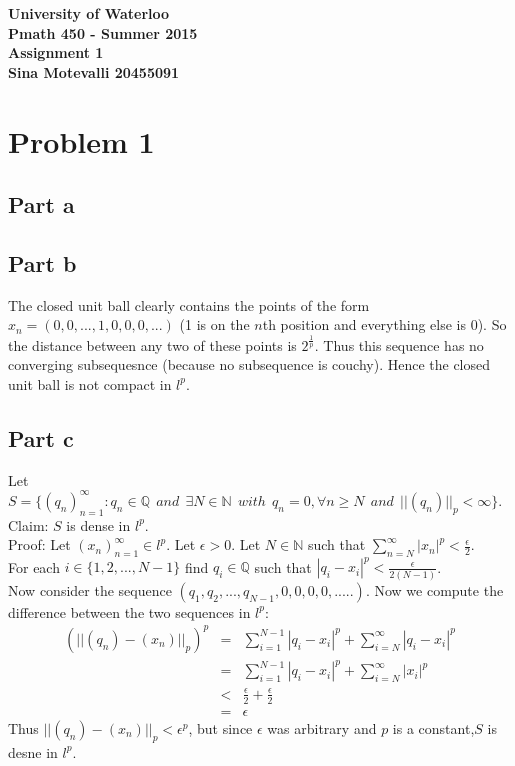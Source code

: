 \documentclass[12pt]{article}
\begin{document}
\begin{center}
  {\Large\bf University of Waterloo}\\
  \vspace{3mm}
         {\Large\bf Pmath 450 - Summer 2015}\\
         \vspace{2mm}
                {\Large\bf Assignment 1}\\
                \vspace{3mm}
                \textbf{Sina Motevalli 20455091}
\end{center}
\section*{Problem 1}
\subsection*{Part a}


\subsection*{Part b}
The closed unit ball clearly contains the points of the form
$x_n=(0,0,...,1,0,0,0,...)$ (1 is on the $n$th position and everything else is 0). 
So the distance between any two of these points is $2^{\frac{1}{p}}$. Thus this sequence has no converging subsequesnce (because no subsequence is couchy). Hence the closed unit ball is not compact in $l^p$.
\subsection*{Part c}
Let $S=\{(q_n)_{n=1}^{\infty} : q_n \in \mathbb{Q} \ \
and \ \ \exists N \in \mathbb{N} \ \ with \ \
q_n=0, \forall n \ge N \ \ and \ \
||(q_n)||_p < \infty\}$. \\
Claim: $S$ is dense in $l^p$.\\
Proof: Let $(x_n)_{n=1}^{\infty} \in l^p$. 
Let $\epsilon > 0$. Let $N \in \mathbb{N}$ such that
$\sum_{n=N}^{\infty} |x_n|^p < \frac{\epsilon}{2}$.
\\
For each $i \in \{1,2,...,N-1\}$ find $q_i \in \mathbb{Q}$ such that $|q_i-x_i|^p < \frac{\epsilon}{2(N-1)}$. \\
Now consider the sequence
$(q_1,q_2,...,q_{N-1},0,0,0,0,.....)$. Now we compute the difference between the two sequences in $l^p$:
\begin{eqnarray*}
(||(q_n)-(x_n)||_p)^p &=& 
\sum_{i=1}^{N-1} |q_i-x_i|^p + \sum_{i=N}^{\infty}
|q_i-x_i|^p
\\ &=&
\sum_{i=1}^{N-1} |q_i-x_i|^p + \sum_{i=N}^{\infty}
|x_i|^p
\\ & < &
\frac{\epsilon}{2} + \frac{\epsilon}{2}
\\ &=&
\epsilon
\end{eqnarray*}
Thus $||(q_n)-(x_n)||_p < \epsilon^p$, but since $\epsilon$ was arbitrary and $p$ is a constant,$S$ is desne in $l^p$.
\end{document}

